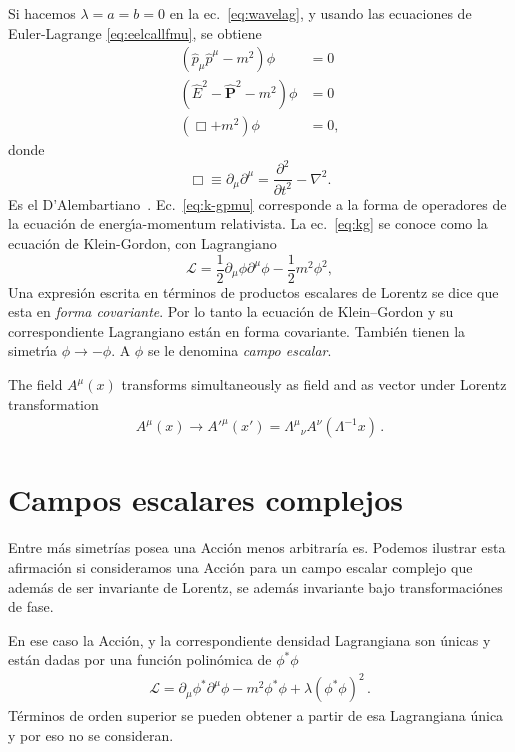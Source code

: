 Si hacemos $\lambda=a=b=0$ en la ec.~\eqref{eq:wavelag}, y usando las
ecuaciones de Euler-Lagrange \eqref{eq:eelcallfmu}, se obtiene
\begin{align}
  (\hat{p}_\mu\hat{p}^\mu-m^2)\phi&=0\nonumber\\
  \label{eq:k-gpmu} %
(\hat{E}^2-\hat{\mathbf{P}}^2-m^2)\phi&=0\\
\label{eq:kg} 
  (\Box+m^2)\phi&=0,
\end{align}
donde
\begin{equation}
  \label{eq:dalambertiano}
  \Box\equiv\partial_\mu\partial^\mu=\frac{\partial^2}{\partial t^2}-\nabla^2. 
\end{equation}
Es el D'Alembartiano~\cite{daelembertiano}. 
Ec.~\eqref{eq:k-gpmu} %
corresponde a la forma de operadores de la
ecuaci\'on de energ\'\i a-momentum relativista. La
ec.~\eqref{eq:kg} se conoce como la ecuaci\'on de Klein-Gordon, con
Lagrangiano
\begin{equation}
  \label{eq:kglag}
  \mathcal{L}=\frac{1}{2}\partial_\mu\phi\partial^\mu\phi-\frac{1}{2}m^2\phi^2, 
\end{equation}
Una expresi\'on escrita en t\'erminos de productos escalares de
Lorentz se dice que esta en \emph{forma covariante}. Por lo tanto la
ecuaci\'on de Klein--Gordon y su correspondiente Lagrangiano est\'an
en forma covariante. Tambi\'en tienen la simetr\'\i a
$\phi\to-\phi$. A $\phi$ se le denomina \emph{campo escalar}.


The field $A^\mu(x)$ transforms simultaneously as field and as vector under Lorentz transformation
\begin{align}
  A^\mu(x)\to {A'}^\mu(x')={\Lambda^\mu}_\nu A^\nu(\Lambda^{-1}x)\,.
\end{align}

\section{Campos escalares complejos}
Entre más simetrías posea una Acción menos arbitraría es. Podemos
ilustrar esta afirmación si consideramos una Acción para un campo escalar
complejo que además de ser invariante de Lorentz, se además invariante
bajo transformaciónes de fase.

\begin{frame}


En ese caso la Acción, y la correspondiente densidad Lagrangiana son
únicas y están dadas por una función polinómica de $\phi^{*}\phi$
\begin{align}
  \mathcal{L}=\partial_{\mu}\phi^{*} \partial^{\mu}\phi-m^2\phi^{*}\phi+\lambda \left(\phi^{*}\phi \right)^2\,.
\end{align}
Términos de orden superior se pueden obtener a partir de esa
Lagrangiana única y por eso no se consideran. 
\end{frame}

